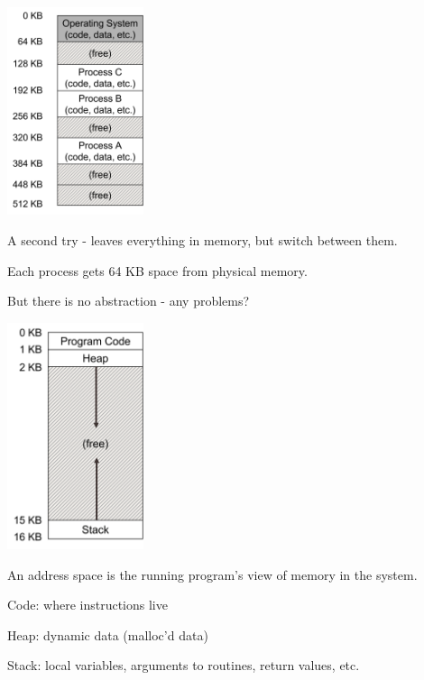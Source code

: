 \begin{slide}


    \begin{minipage}{0.3\textwidth}
    \includegraphics[width=40mm]{multi-process-mem.png}
    \end{minipage}
    \hfill
    \begin{minipage}{0.65\textwidth}
        A second try - leaves everything in memory, but switch between them.
        \bigskip

        Each process gets 64 KB space from physical memory.
        \bigskip

        But there is no abstraction - any problems?
    \end{minipage}

\end{slide}

\begin{slide}


    \begin{minipage}{0.3\textwidth}
        \includegraphics[width=40mm]{address-space-segments.png}
    \end{minipage}
    \hfill
    \begin{minipage}{0.65\textwidth}
        An address space is the running program's view of memory in the system.
        \bigskip

        Code: where instructions live
        \bigskip

        Heap: dynamic data (malloc'd data)
        \bigskip

        Stack: local variables, arguments to routines, return values, etc.
    \end{minipage}
    
\end{slide}

